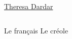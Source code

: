 \documentclass{beamer}
\begin{document}
    \begin{frame}[t]{}
      \centering
      \href{https://youtu.be/OHNR8ZTPBmQ?t=150}{Theresa Dardar}
      \begin{columns}
          \centering
          Le français
          \centering
          Le créole
      \end{columns}
    \end{frame}
\end{document}
